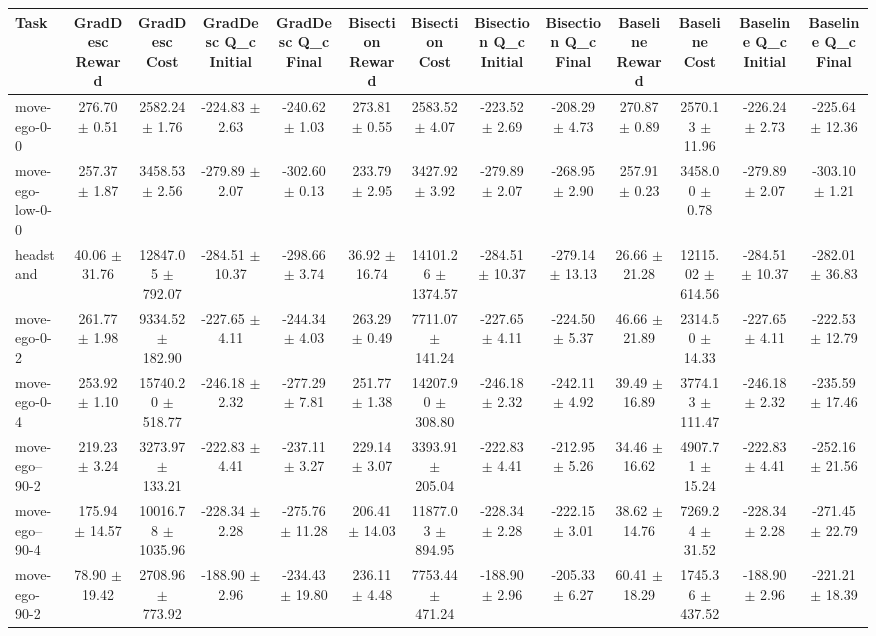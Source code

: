 \begin{tabular}{|lcccccccccccc|}
\hline
Task & GradDesc Reward & GradDesc Cost & GradDesc Q_c Initial & GradDesc Q_c Final & Bisection Reward & Bisection Cost & Bisection Q_c Initial & Bisection Q_c Final & Baseline Reward & Baseline Cost & Baseline Q_c Initial & Baseline Q_c Final \\
\hline
move-ego-0-0 & 276.70 $\pm$ 0.51 & 2582.24 $\pm$ 1.76 & -224.83 $\pm$ 2.63 & -240.62 $\pm$ 1.03 & 273.81 $\pm$ 0.55 & 2583.52 $\pm$ 4.07 & -223.52 $\pm$ 2.69 & -208.29 $\pm$ 4.73 & 270.87 $\pm$ 0.89 & 2570.13 $\pm$ 11.96 & -226.24 $\pm$ 2.73 & -225.64 $\pm$ 12.36 \\
move-ego-low-0-0 & 257.37 $\pm$ 1.87 & 3458.53 $\pm$ 2.56 & -279.89 $\pm$ 2.07 & -302.60 $\pm$ 0.13 & 233.79 $\pm$ 2.95 & 3427.92 $\pm$ 3.92 & -279.89 $\pm$ 2.07 & -268.95 $\pm$ 2.90 & 257.91 $\pm$ 0.23 & 3458.00 $\pm$ 0.78 & -279.89 $\pm$ 2.07 & -303.10 $\pm$ 1.21 \\
headstand & 40.06 $\pm$ 31.76 & 12847.05 $\pm$ 792.07 & -284.51 $\pm$ 10.37 & -298.66 $\pm$ 3.74 & 36.92 $\pm$ 16.74 & 14101.26 $\pm$ 1374.57 & -284.51 $\pm$ 10.37 & -279.14 $\pm$ 13.13 & 26.66 $\pm$ 21.28 & 12115.02 $\pm$ 614.56 & -284.51 $\pm$ 10.37 & -282.01 $\pm$ 36.83 \\
move-ego-0-2 & 261.77 $\pm$ 1.98 & 9334.52 $\pm$ 182.90 & -227.65 $\pm$ 4.11 & -244.34 $\pm$ 4.03 & 263.29 $\pm$ 0.49 & 7711.07 $\pm$ 141.24 & -227.65 $\pm$ 4.11 & -224.50 $\pm$ 5.37 & 46.66 $\pm$ 21.89 & 2314.50 $\pm$ 14.33 & -227.65 $\pm$ 4.11 & -222.53 $\pm$ 12.79 \\
move-ego-0-4 & 253.92 $\pm$ 1.10 & 15740.20 $\pm$ 518.77 & -246.18 $\pm$ 2.32 & -277.29 $\pm$ 7.81 & 251.77 $\pm$ 1.38 & 14207.90 $\pm$ 308.80 & -246.18 $\pm$ 2.32 & -242.11 $\pm$ 4.92 & 39.49 $\pm$ 16.89 & 3774.13 $\pm$ 111.47 & -246.18 $\pm$ 2.32 & -235.59 $\pm$ 17.46 \\
move-ego--90-2 & 219.23 $\pm$ 3.24 & 3273.97 $\pm$ 133.21 & -222.83 $\pm$ 4.41 & -237.11 $\pm$ 3.27 & 229.14 $\pm$ 3.07 & 3393.91 $\pm$ 205.04 & -222.83 $\pm$ 4.41 & -212.95 $\pm$ 5.26 & 34.46 $\pm$ 16.62 & 4907.71 $\pm$ 15.24 & -222.83 $\pm$ 4.41 & -252.16 $\pm$ 21.56 \\
move-ego--90-4 & 175.94 $\pm$ 14.57 & 10016.78 $\pm$ 1035.96 & -228.34 $\pm$ 2.28 & -275.76 $\pm$ 11.28 & 206.41 $\pm$ 14.03 & 11877.03 $\pm$ 894.95 & -228.34 $\pm$ 2.28 & -222.15 $\pm$ 3.01 & 38.62 $\pm$ 14.76 & 7269.24 $\pm$ 31.52 & -228.34 $\pm$ 2.28 & -271.45 $\pm$ 22.79 \\
move-ego-90-2 & 78.90 $\pm$ 19.42 & 2708.96 $\pm$ 773.92 & -188.90 $\pm$ 2.96 & -234.43 $\pm$ 19.80 & 236.11 $\pm$ 4.48 & 7753.44 $\pm$ 471.24 & -188.90 $\pm$ 2.96 & -205.33 $\pm$ 6.27 & 60.41 $\pm$ 18.29 & 1745.36 $\pm$ 437.52 & -188.90 $\pm$ 2.96 & -221.21 $\pm$ 18.39 \\

\end{tabular}
